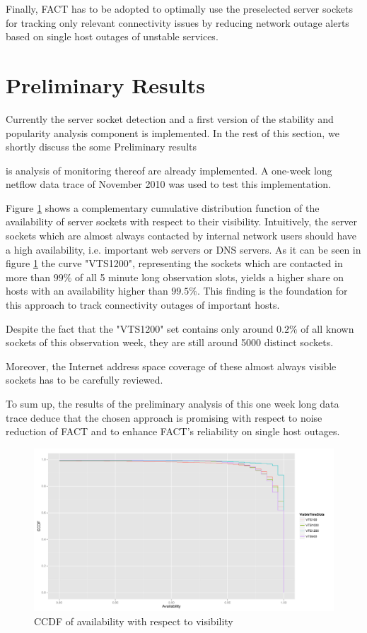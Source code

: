 \documentclass{sigcomm-alternate}
\begin{document}
Finally, FACT has to be adopted to optimally use the preselected server
sockets for tracking only relevant connectivity issues by reducing
network outage alerts based on single host outages of unstable services.

\section{Preliminary Results} 
Currently the server socket detection and a first version of the 
stability and popularity analysis component is implemented. In the 
rest of this section, we shortly discuss the some Preliminary 
results 



is analysis of monitoring thereof are 
already implemented. A one-week long netflow data trace of November 
2010 was used to test this implementation. 



Figure \ref{fig:RatioVTS} shows a complementary cumulative distribution
function of the availability of server sockets with respect to their
visibility. Intuitively, the server sockets which are almost always
contacted by internal network users should have a high availability,
i.e. important web servers or DNS servers. As it can be seen in
figure \ref{fig:RatioVTS} the curve "VTS1200", representing the
sockets which are contacted in more than $99\%$ of all 5 minute
long observation slots, yields a higher share on hosts with an
availability higher than $99.5\%$. This finding is the foundation
for this approach to track connectivity outages of important hosts.

Despite the fact that the "VTS1200" set contains only around $0.2\%$
of all known sockets of this observation week, they are still around
5000 distinct sockets.

Moreover, the Internet address space coverage of these almost always
visible sockets has to be carefully reviewed.

To sum up, the results of the preliminary analysis of this one week
long data trace deduce that the chosen approach is promising with
respect to noise reduction of FACT and to enhance FACT's reliability
on single host outages.

\begin{figure}[ht!]
\centering \includegraphics[width=18cm]{images/RATIO_VTS_External.pdf}
\caption{CCDF of availability with respect to visibility}
\label{fig:RatioVTS}
\end{figure}



\end{document}
